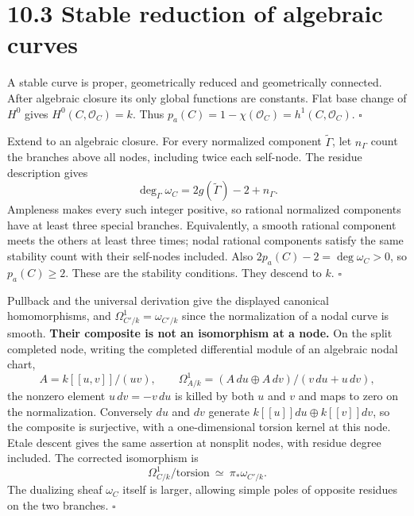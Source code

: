 \documentclass[11pt]{article}
\let\chapterexercise\exercise
\renewcommand{\exercise}[2]{\Needspace{8\baselineskip}\chapterexercise{#1}{#2}}
\begin{document}
\section*{10.3 Stable reduction of algebraic curves}

\pf A stable curve is proper, geometrically reduced and geometrically connected. After algebraic closure its only global functions are constants. Flat base change of $H^0$ gives $H^0(C,\mathcal O_C)=k$. Thus $p_a(C)=1-\chi(\mathcal O_C)=h^1(C,\mathcal O_C)$. \hfill$\square$

\pf Extend to an algebraic closure. For every normalized component $\widetilde\Gamma$, let $n_\Gamma$ count the branches above all nodes, including twice each self-node. The residue description gives
\[ \deg_\Gamma\omega_C=2g(\widetilde\Gamma)-2+n_\Gamma. \]
Ampleness makes every such integer positive, so rational normalized components have at least three special branches. Equivalently, a smooth rational component meets the others at least three times; nodal rational components satisfy the same stability count with their self-nodes included. Also $2p_a(C)-2=\deg\omega_C>0$, so $p_a(C)\ge2$. These are the stability conditions. They descend to $k$. \hfill$\square$

\pf Pullback and the universal derivation give the displayed canonical homomorphisms, and $\Omega^1_{C'/k}=\omega_{C'/k}$ since the normalization of a nodal curve is smooth. \textbf{Their composite is not an isomorphism at a node.} On the split completed node, writing the completed differential module of an algebraic nodal chart,
\[ A=k[[u,v]]/(uv),\qquad
\Omega^1_{A/k}=(A\,du\oplus A\,dv)/(v\,du+u\,dv), \]
the nonzero element $u\,dv=-v\,du$ is killed by both $u$ and $v$ and maps to zero on the normalization. Conversely $du$ and $dv$ generate $k[[u]]du\oplus k[[v]]dv$, so the composite is surjective, with a one-dimensional torsion kernel at this node. Etale descent gives the same assertion at nonsplit nodes, with residue degree included. The corrected isomorphism is
\[ \Omega^1_{C/k}/\text{torsion}\ \simeq\ \pi_*\omega_{C'/k}. \]
The dualizing sheaf $\omega_C$ itself is larger, allowing simple poles of opposite residues on the two branches. \hfill$\square$
\end{document}
